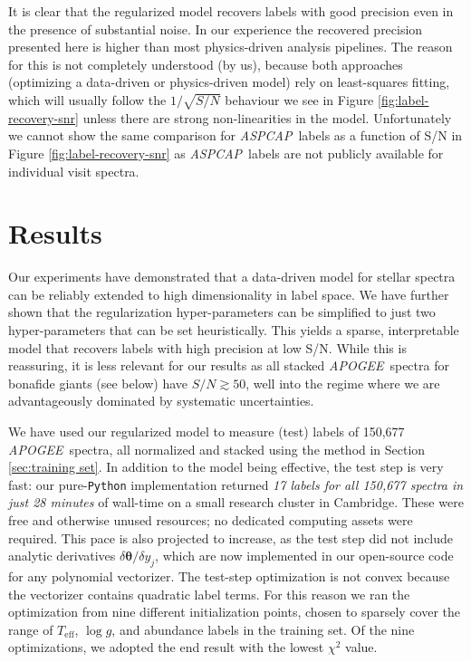 \documentclass[12pt,preprint]{aastex}
\newcommand{\project}[1]{\textsl{#1}}
\newcommand{\acronym}[1]{{\small{#1}}}
\newcommand{\apogee}{\project{\acronym{APOGEE}}}
\newcommand{\aspcap}{\project{\acronym{ASPCAP}}}
\newcommand{\logg}{\log g}
\newcommand{\Teff}{T_{\mathrm{eff}}}
\newcommand{\Dvector}[1]{\boldsymbol{#1}}
\newcommand{\vectheta}{\Dvector{\theta}}
\begin{document}
It is clear that the regularized model recovers labels with good precision even
in the presence of substantial noise.  In our experience the recovered 
precision presented here is higher than most physics-driven analysis pipelines.  
The reason for this is not completely understood (by us), because both approaches 
(optimizing a data-driven or physics-driven model) rely on least-squares 
fitting, which will usually follow the $1/\sqrt{S/N}$ behaviour we see in Figure 
\ref{fig:label-recovery-snr} unless there are strong non-linearities in the model.
Unfortunately we cannot show the same comparison for \aspcap\ labels as a 
function of S/N in Figure \ref{fig:label-recovery-snr} as \aspcap\ labels are not
publicly available for individual visit spectra.




\section{Results}
\label{sec:results}


Our experiments have demonstrated that a data-driven model for stellar spectra
can be reliably extended to high dimensionality in label space.  We have further
shown that the regularization hyper-parameters can be simplified to just two
hyper-parameters that can be set heuristically.  This yields a sparse, interpretable 
model that recovers labels with high precision at low S/N.  While this is 
reassuring, it is less relevant for our results as all stacked \apogee\
spectra for bonafide giants (see below) have $S/N \gtrsim 50$, well into the 
regime where we are advantageously dominated by systematic uncertainties.


We have used our regularized model to measure (test) labels of 150,677 \apogee\ 
spectra, all normalized and stacked using the method in Section 
\ref{sec:training set}.  In addition to the model being effective,
the test step is very fast: our pure-\texttt{Python} implementation returned 
\emph{17 labels for all 150,677 spectra in just 28 minutes} of wall-time 
on a small research cluster in Cambridge.  These were free 
and otherwise unused resources; no dedicated computing assets were required.  
This pace is also projected to increase, as the test step did not include 
analytic derivatives $\delta\vectheta/\delta{}y_j$, which are now implemented
in our open-source code for any polynomial vectorizer.  The test-step 
optimization is not convex because the vectorizer contains
quadratic label terms.  For this reason we ran the optimization from nine
different initialization points, chosen to sparsely cover the range of
$\Teff$, $\logg$, and abundance labels in the training set.  Of the nine
optimizations, we adopted the end result with the lowest $\chi^2$ value.
\end{document}
